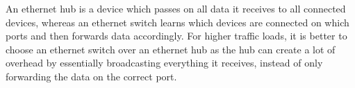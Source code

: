 An ethernet hub is a device which passes on all data it receives to all connected devices, whereas an ethernet switch learns which devices are connected on which ports and then forwards data accordingly. For higher traffic loads, it is better to choose an ethernet switch over an ethernet hub as the hub can create a lot of overhead by essentially broadcasting everything it receives, instead of only forwarding the data on the correct port.
